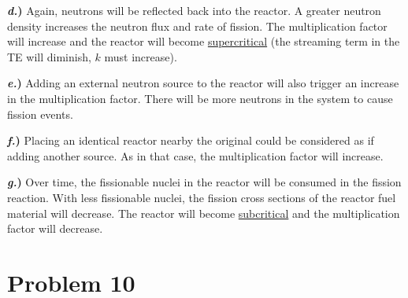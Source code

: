 \documentclass{article}
\begin{document}
\textbf{\textit{d.})} Again, neutrons will be reflected back into the reactor. A greater neutron density increases the neutron flux and rate of fission. The multiplication factor will increase and the reactor will become \underline{supercritical}  (the streaming term in the TE will diminish, $k$ must increase).

\textbf{\textit{e.})} Adding an external neutron source to the reactor will also trigger an increase in the multiplication factor. There will be more neutrons in the system to cause fission events.

\textbf{\textit{f.})} Placing an identical reactor nearby the original could be considered as if adding another source. As in that case, the multiplication factor will increase.

\textbf{\textit{g.})} Over time, the fissionable nuclei in the reactor will be consumed in the fission reaction. With less fissionable nuclei, the fission cross sections of the reactor fuel material will decrease. The reactor will become \underline{subcritical} and the multiplication factor will decrease.




\section*{Problem 10}
\end{document}

